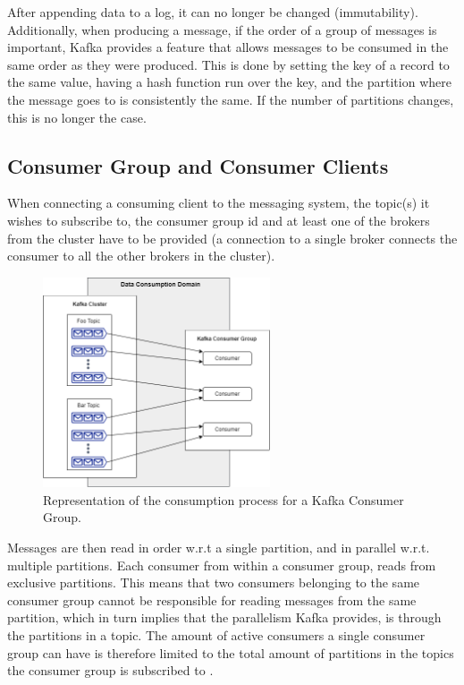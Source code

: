 After appending data to a log, it can no longer be changed (immutability).
Additionally, when producing a message, if the order of a group of messages is
important, Kafka provides a feature that allows messages to be consumed in the
same order as they were produced. This is done by setting the key of a record to
the same value, having a hash function run over the key, and the partition where
the message goes to is consistently the same. If the number of partitions
changes, this is no longer the case.

\subsection{Consumer Group and Consumer Clients}
\label{sec:kafka_consumer_group}

When connecting a consuming client to the messaging system, the topic(s) it
wishes to subscribe to, the consumer group id and at least one of the brokers from
the cluster have to be provided (a connection to a single broker connects the
consumer to all the other brokers in the cluster). 

\begin{figure}[hbt!] 
    \centering
    \includegraphics[width=0.6\textwidth]{images/infrastructure/Consumption Domain.png}
    \caption{
        Representation of the consumption process for a Kafka Consumer Group.
    } 
    \label{fig:data_consumption_domain} 
\end{figure}

Messages are then read in order w.r.t a single partition, and in parallel w.r.t.
multiple partitions. Each consumer from within a consumer group, reads from
exclusive partitions.  This means that two consumers belonging to the same
consumer group cannot be responsible for reading messages from the same
partition, which in turn implies that the parallelism Kafka provides, is through
the partitions in a topic. The amount of active consumers a single consumer
group can have is therefore limited to the total amount of partitions in the
topics the consumer group is subscribed to \cite{OreillyConsumer}. 

